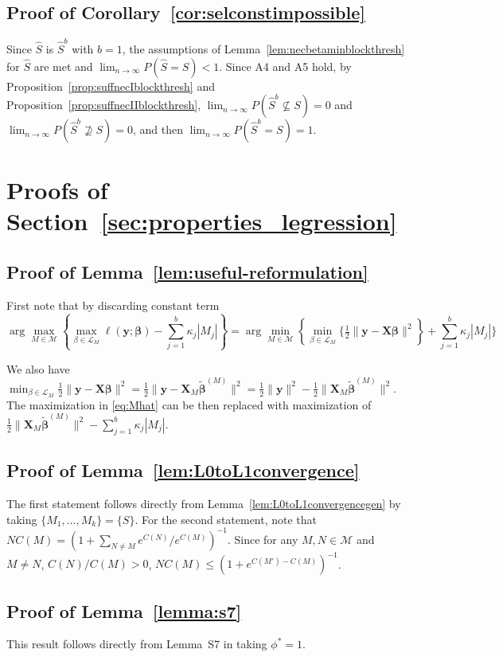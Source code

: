 \documentclass[aos]{imsart}
\theoremstyle{plain}
\newcommand{\M}{\mathcal{M}}
\newcommand{\bs}{\boldsymbol}
\begin{document}
\subsection{Proof of Corollary~\ref{cor:selconstimpossible}}

Since $\hat{S}$ is $\hat{S}^b$ with $b=1$, the assumptions of Lemma~\ref{lem:necbetaminblockthresh} for $\hat{S}$ are met and $\lim_{n \to \infty} P(\hat{S} = S) < 1$. Since A4 and A5 hold, by Proposition~\ref{prop:suffnecIblockthresh} and Proposition~\ref{prop:suffnecIIblockthresh}, $\lim_{n \to \infty} P(\hat{S}^b \not\subseteq S)= 0$ and $\lim_{n \to \infty} P(\hat{S}^b \not\supseteq S)= 0$, and then $\lim_{n \to \infty} P(\hat{S}^b = S)= 1$.

\section{Proofs of Section~\ref{sec:properties_legression}}
\subsection{Proof of Lemma~\ref{lem:useful-reformulation}}
	First note that by discarding constant term 
 $$\arg\max_{M\in \M} \left\{\max_{\beta\in \mathcal{L}_M}\ell(\bs y; \bs \beta)-\sum_{j=1}^b\kappa_j |M_j| \right\}=\arg\min_{M\in \M} \left\{\min_{\beta\in \mathcal{L}_M}\bigg\{ \tfrac{1}{2}\|\bs y-\bs X\bs\beta\|^2\right\}+\sum_{j=1}^b\kappa_j |M_j| \bigg\}$$
 
 We also have $\min_{\beta\in \mathcal{L}_M} \tfrac{1}{2}\|\bs y-\bs X\bs\beta\|^2=\tfrac{1}{2}\|\bs y-\bs X_{\!\!M}\tilde{\bs \beta}^{(M)}\|^2=\tfrac{1}{2}\|\bs y\|^2-\tfrac{1}{2}\|\bs X_{\!\!M}\tilde{\bs\beta}^{(M)}\|^2$. The maximization in \eqref{eq:Mhat} can be then replaced with maximization of $\tfrac{1}{2}
 \|\bs X_{\!\!M}\tilde{\bs\beta}^{(M)}\|^2-\sum_{j=1}^b \kappa_j|M_j|$.

\subsection{Proof of Lemma~\ref{lem:L0toL1convergence}}
The first statement follows directly from Lemma~\ref{lem:L0toL1convergencegen} by taking $\{M_1,\ldots,M_k\}=\{S\}$. For the second statement, note that  $NC(M)=(1+\sum_{N \neq M} e^{C(N)}/ e^{C(M)})^{-1}$. Since for any $M,N\in \M$ and $M\neq N$, $C(N) / C(M)>0$, $NC(M) \leq (1+e^{C(M')-C(M)})^{-1}$.

\subsection{Proof of Lemma~\ref{lemma:s7}}
    This result follows directly from Lemma~S7 in \cite{rossell2022concentration} taking $\phi^*=1$.
\end{document}
